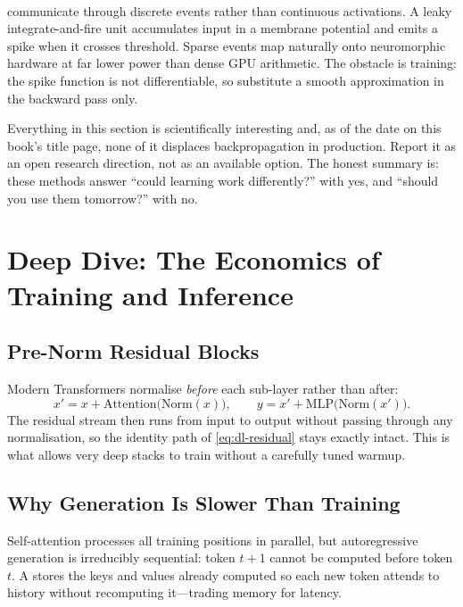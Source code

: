  communicate through discrete events rather
than continuous activations\textsuperscript{\cite{maassNetworksSpikingNeurons1997}}.
A leaky integrate-and-fire unit accumulates input in a membrane potential and
emits a spike when it crosses threshold. Sparse events map naturally onto
neuromorphic hardware at far lower power than dense GPU arithmetic. The
obstacle is training: the spike function is not differentiable, so
 substitute a smooth approximation in the backward
pass only.

\begin{engineernote}
Everything in this section is scientifically interesting and, as of the date on
this book's title page, none of it displaces backpropagation in production.
Report it as an open research direction, not as an available option. The honest
summary is: these methods answer ``could learning work differently?'' with yes,
and ``should you use them tomorrow?'' with no.
\end{engineernote}

\section{Deep Dive: The Economics of Training and Inference}

\subsection{Pre-Norm Residual Blocks}

Modern Transformers normalise \emph{before} each sub-layer rather than after:
\[
  x' = x + \mathrm{Attention}\bigl(\mathrm{Norm}(x)\bigr),
  \qquad
  y = x' + \mathrm{MLP}\bigl(\mathrm{Norm}(x')\bigr).
\]
The residual stream then runs from input to output without passing through any
normalisation, so the identity path of \cref{eq:dl-residual} stays exactly
intact. This is what allows very deep stacks to train without a carefully tuned
warmup.

\subsection{Why Generation Is Slower Than Training}

Self-attention processes all training positions in parallel, but autoregressive
generation is irreducibly sequential: token $t+1$ cannot be computed before
token $t$. A  stores the keys and values already
computed so each new token attends to history without recomputing it---trading
memory for latency.

